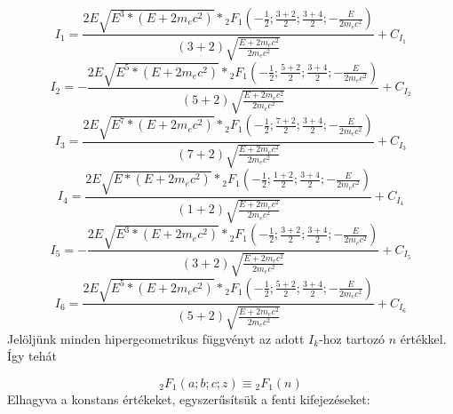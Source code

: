 \begin{equation} \label{eq:42}
I_{1}
=
\frac{2 E \sqrt{E^{3} * \left( E + 2m_{e}c^{2} \right)} * {}_{2}F_{1} \left( -\frac{1}{2}; \frac{3 + 2}{2}; \frac{3 + 4}{2}; -\frac{E}{2m_{e}c^{2}} \right)}{\left( 3 + 2 \right) \sqrt{\frac{E + 2m_{e}c^{2}}{2m_{e}c^{2}}}} + C_{I_{1}}
\end{equation}
\begin{equation} \label{eq:43}
I_{2}
=
- \frac{2 E \sqrt{E^{5} * \left( E + 2m_{e}c^{2} \right)} * {}_{2}F_{1} \left( -\frac{1}{2}; \frac{5 + 2}{2}; \frac{3 + 4}{2}; -\frac{E}{2m_{e}c^{2}} \right)}{\left( 5 + 2 \right) \sqrt{\frac{E + 2m_{e}c^{2}}{2m_{e}c^{2}}}} + C_{I_{2}}
\end{equation}
\begin{equation} \label{eq:44}
I_{3}
=
\frac{2 E \sqrt{E^{7} * \left( E + 2m_{e}c^{2} \right)} * {}_{2}F_{1} \left( -\frac{1}{2}; \frac{7 + 2}{2}; \frac{3 + 4}{2}; -\frac{E}{2m_{e}c^{2}} \right)}{\left( 7 + 2 \right) \sqrt{\frac{E + 2m_{e}c^{2}}{2m_{e}c^{2}}}} + C_{I_{3}}
\end{equation}
\begin{equation} \label{eq:45}
I_{4}
=
\frac{2 E \sqrt{E * \left( E + 2m_{e}c^{2} \right)} * {}_{2}F_{1} \left( -\frac{1}{2}; \frac{1 + 2}{2}; \frac{3 + 4}{2}; -\frac{E}{2m_{e}c^{2}} \right)}{\left( 1 + 2 \right) \sqrt{\frac{E + 2m_{e}c^{2}}{2m_{e}c^{2}}}} + C_{I_{4}}
\end{equation}
\begin{equation} \label{eq:46}
I_{5}
=
- \frac{2 E \sqrt{E^{3} * \left( E + 2m_{e}c^{2} \right)} * {}_{2}F_{1} \left( -\frac{1}{2}; \frac{3 + 2}{2}; \frac{3 + 4}{2}; -\frac{E}{2m_{e}c^{2}} \right)}{\left( 3 + 2 \right) \sqrt{\frac{E + 2m_{e}c^{2}}{2m_{e}c^{2}}}} + C_{I_{5}}
\end{equation}
\begin{equation} \label{eq:47}
I_{6}
=
\frac{2 E \sqrt{E^{5} * \left( E + 2m_{e}c^{2} \right)} * {}_{2}F_{1} \left( -\frac{1}{2}; \frac{5 + 2}{2}; \frac{3 + 4}{2}; -\frac{E}{2m_{e}c^{2}} \right)}{\left( 5 + 2 \right) \sqrt{\frac{E + 2m_{e}c^{2}}{2m_{e}c^{2}}}} + C_{I_{6}}
\end{equation}
Jelöljünk minden hipergeometrikus függvényt az adott $I_{k}$-hoz tartozó $n$ értékkel. Így tehát

\begin{equation}\label{eq:48}
{}_{2}F_{1} \left( a; b; c; z \right)
\equiv
{}_{2}F_{1} \left( n \right)
\end{equation}
Elhagyva a konstans értékeket, egyszerűsítsük a fenti kifejezéseket:

